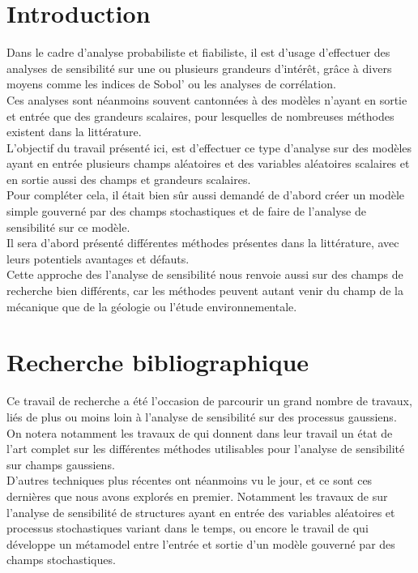 \documentclass[a4paper,10pt]{article}
\begin{document}
\section{Introduction}
Dans le cadre d'analyse probabiliste et fiabiliste, il est d'usage d’effectuer des analyses de sensibilité sur une ou plusieurs grandeurs d’intérêt, grâce à divers moyens comme les indices de Sobol' ou les analyses de corrélation. \\
Ces analyses sont néanmoins souvent cantonnées à des modèles n'ayant en sortie et entrée que des grandeurs scalaires, pour lesquelles de nombreuses méthodes existent dans la littérature.\\
L'objectif du travail présenté ici, est d’effectuer ce type d'analyse sur des modèles ayant en entrée plusieurs champs aléatoires et des variables aléatoires scalaires et en sortie aussi des champs et grandeurs scalaires. \\ Pour compléter cela, il était bien sûr aussi demandé de d'abord créer un modèle simple gouverné par des champs stochastiques et de faire de l'analyse de sensibilité sur ce modèle. \\
Il sera d'abord présenté différentes méthodes présentes dans la littérature, avec leurs potentiels avantages et défauts. \\ 
Cette approche des l'analyse de sensibilité nous renvoie aussi sur des champs de recherche bien différents, car les méthodes peuvent autant venir du champ de la mécanique que de la géologie ou l'étude environnementale.

 
\section{Recherche bibliographique}
Ce travail de recherche a été l'occasion de parcourir un grand nombre de travaux, liés de plus ou moins loin à l'analyse de sensibilité sur des processus gaussiens.\\
On notera notamment les travaux de \cite{Lilburne2009Feb} qui donnent dans leur travail un état de l'art complet sur les différentes méthodes utilisables pour l'analyse de sensibilité sur champs gaussiens. \\
D'autres techniques plus récentes ont néanmoins vu le jour, et ce sont ces dernières que nous avons explorés en premier. Notamment les travaux de \cite{Wei2017May} sur l'analyse de sensibilité de structures ayant en entrée des variables aléatoires et processus stochastiques variant dans le temps, ou encore le travail de \cite{Pronzato2019Jul} qui développe un métamodel entre l'entrée et sortie d'un modèle gouverné par des champs stochastiques.
\end{document}
